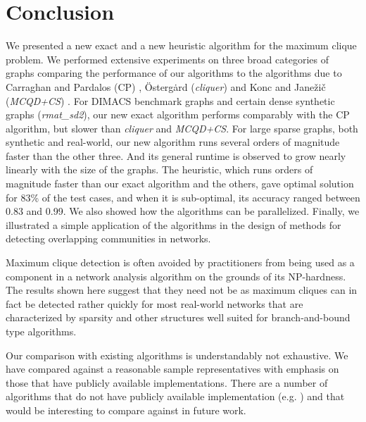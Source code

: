 \section{Conclusion}
\label{sec:conclusion}

We presented a new exact and a new heuristic algorithm for the maximum clique problem.
We performed extensive experiments on three broad categories of graphs comparing the 
performance of our algorithms to the algorithms due to
Carraghan and Pardalos (CP) \cite{pardalos},
\"{O}sterg\.{a}rd ({\it cliquer}) \cite{ostergard} and
Konc and Jane\v{z}i\v{c} ({\it MCQD+CS}) \cite{konc2007improved}.
For DIMACS benchmark graphs and certain dense synthetic graphs ({\it rmat\_sd2}), our new exact algorithm performs comparably with the CP algorithm, but slower than {\it cliquer}
and {\it MCQD+CS}. 
For large sparse graphs, both synthetic and real-world, our new algorithm runs
several orders of magnitude faster than the other three. 
And its general runtime is observed to grow nearly linearly with the size of the graphs. 
The heuristic, which runs orders of magnitude faster than our exact algorithm and the others, gave optimal solution for 83\% of the test cases, and when it is sub-optimal, its accuracy ranged between 0.83 and 0.99.
We also showed how the algorithms can be parallelized. Finally, we illustrated a simple application of the algorithms in the design of methods for detecting overlapping communities in networks. 

Maximum clique detection is often avoided by practitioners from being used as a component in 
a network analysis algorithm on the grounds of its NP-hardness. The results shown here suggest that they need
not be as maximum cliques can in fact be detected rather quickly for most real-world networks that are characterized by sparsity and other structures well suited for branch-and-bound type algorithms.

Our comparison with existing algorithms is understandably not exhaustive.
We have compared against a reasonable sample representatives with emphasis on those
that have publicly available implementations. There are a number of algorithms that do not have publicly available implementation (e.g. \cite{walcom,AAAI101611}) and that would be interesting to compare against in future work. 
